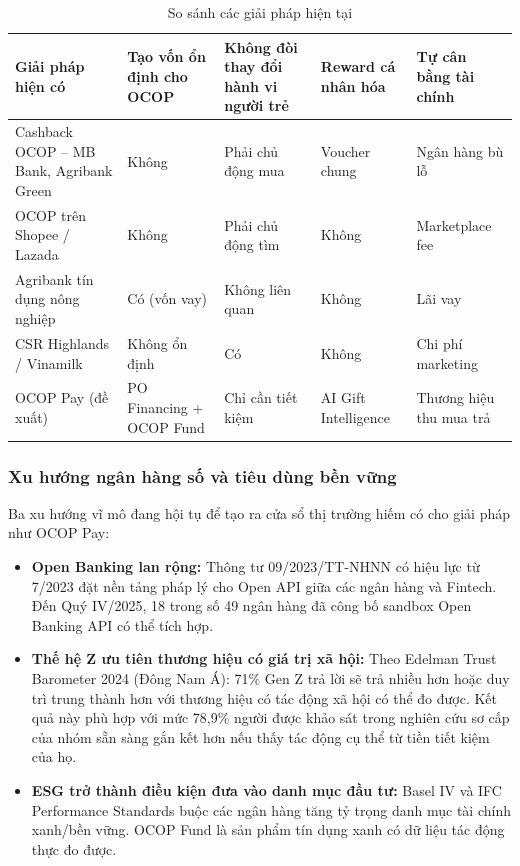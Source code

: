 \documentclass[13pt,a4paper]{extarticle}
\begin{document}
\begin{table}[H]
\centering
\caption{So sánh các giải pháp hiện tại}
\begin{tabular}{|p{3cm}|p{2.5cm}|p{2.5cm}|p{2.5cm}|p{2.5cm}|}
\hline
\textbf{Giải pháp hiện có} & \textbf{Tạo vốn ổn định cho OCOP} & \textbf{Không đòi thay đổi hành vi người trẻ} & \textbf{Reward cá nhân hóa} & \textbf{Tự cân bằng tài chính} \\
\hline
Cashback OCOP – MB Bank, Agribank Green & Không & Phải chủ động mua & Voucher chung & Ngân hàng bù lỗ \\
\hline
OCOP trên Shopee / Lazada & Không & Phải chủ động tìm & Không & Marketplace fee \\
\hline
Agribank tín dụng nông nghiệp & Có (vốn vay) & Không liên quan & Không & Lãi vay \\
\hline
CSR Highlands / Vinamilk & Không ổn định & Có & Không & Chi phí marketing \\
\hline
OCOP Pay (đề xuất) & PO Financing + OCOP Fund & Chỉ cần tiết kiệm & AI Gift Intelligence & Thương hiệu thu mua trả \\
\hline
\end{tabular}
\end{table}

\subsubsection{Xu hướng ngân hàng số và tiêu dùng bền vững}

Ba xu hướng vĩ mô đang hội tụ để tạo ra cửa sổ thị trường hiếm có cho giải pháp như OCOP Pay:

\begin{itemize}
    \item \textbf{Open Banking lan rộng:} Thông tư 09/2023/TT-NHNN có hiệu lực từ 7/2023 đặt nền tảng pháp lý cho Open API giữa các ngân hàng và Fintech. Đến Quý IV/2025, 18 trong số 49 ngân hàng đã công bố sandbox Open Banking API có thể tích hợp.

    \item \textbf{Thế hệ Z ưu tiên thương hiệu có giá trị xã hội:} Theo Edelman Trust Barometer 2024 (Đông Nam Á): 71\% Gen Z trả lời sẽ trả nhiều hơn hoặc duy trì trung thành hơn với thương hiệu có tác động xã hội có thể đo được. Kết quả này phù hợp với mức 78,9\% người được khảo sát trong nghiên cứu sơ cấp của nhóm sẵn sàng gắn kết hơn nếu thấy tác động cụ thể từ tiền tiết kiệm của họ.

    \item \textbf{ESG trở thành điều kiện đưa vào danh mục đầu tư:} Basel IV và IFC Performance Standards buộc các ngân hàng tăng tỷ trọng danh mục tài chính xanh/bền vững. OCOP Fund là sản phẩm tín dụng xanh có dữ liệu tác động thực đo được.
\end{itemize}
\end{document}
